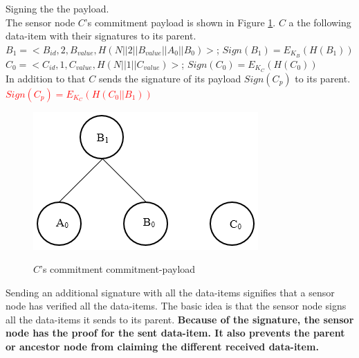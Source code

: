 		\begin{exmp}
		Signing the the payload.\\	
		The sensor node $C$'s commitment payload is shown in Figure \ref{fig:Commitment payload of C}.
		$C$ a the following data-item with their signatures to its parent.\\
		$B_{1} = <B_{id}, 2, B_{value}, H(N||2||B_{value}||A_{0}||B_{0})>$; $Sign(B_{1}) = E_{K_{B}}(H(B_{1}))$\\
		$C_{0} = <C_{id}, 1, C_{value}, H(N||1||C_{value})>$; $Sign(C_{0}) = E_{K_{C}}(H(C_{0}))$\\
		In addition to that $C$ sends the signature of its payload $Sign(C_{p})$ to its parent.\\
		\textcolor{red}{$Sign(C_{p}) = E_{K_{C}}(H(C_{0} || B_{1}))$}

			\begin{figure}[hp]
				\centering
				\includegraphics[scale = 0.5]{images/commitment-payload-of-C.png}\\
				\caption{$C$'s commitment commitment-payload}
				\label{fig:Commitment payload of C}
			\end{figure}
		\end{exmp}
	Sending an additional signature with all the data-items signifies that a sensor node has verified all the data-items.
	The basic idea is that the sensor node signs all the data-items it sends to its parent.
	\textbf{Because of the signature, the sensor node has the proof for the sent data-item.
	It also prevents the parent or ancestor node from claiming the different received data-item.}

